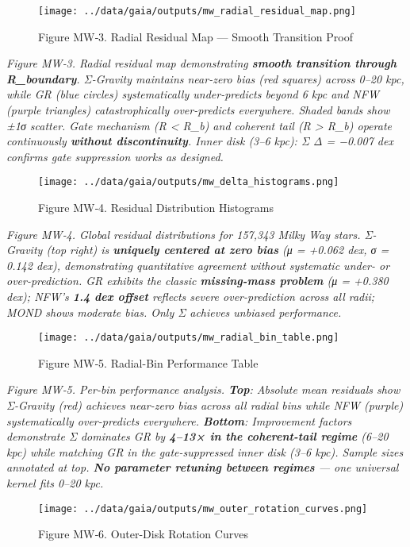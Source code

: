 \documentclass[11pt,a4paper]{article}
\begin{document}
\begin{figure}[h]
\centering
\texttt{[image: ../data/gaia/outputs/mw\_radial\_residual\_map.png]}
\caption{Figure MW‑3. Radial Residual Map — Smooth Transition Proof}
\end{figure}


\textit{Figure MW‑3. Radial residual map demonstrating \textbf{smooth transition through R\_boundary}. Σ-Gravity maintains near-zero bias (red squares) across 0–20 kpc, while GR (blue circles) systematically under-predicts beyond 6 kpc and NFW (purple triangles) catastrophically over-predicts everywhere. Shaded bands show ±1σ scatter. Gate mechanism (R < R\_b) and coherent tail (R > R\_b) operate continuously \textbf{without discontinuity}. Inner disk (3–6 kpc): Σ Δ = −0.007 dex confirms gate suppression works as designed.}


\begin{figure}[h]
\centering
\texttt{[image: ../data/gaia/outputs/mw\_delta\_histograms.png]}
\caption{Figure MW‑4. Residual Distribution Histograms}
\end{figure}


\textit{Figure MW‑4. Global residual distributions for 157,343 Milky Way stars. Σ-Gravity (top right) is \textbf{uniquely centered at zero bias} (μ = +0.062 dex, σ = 0.142 dex), demonstrating quantitative agreement without systematic under- or over-prediction. GR exhibits the classic \textbf{missing-mass problem} (μ = +0.380 dex); NFW's \textbf{1.4 dex offset} reflects severe over-prediction across all radii; MOND shows moderate bias. Only Σ achieves unbiased performance.}


\begin{figure}[h]
\centering
\texttt{[image: ../data/gaia/outputs/mw\_radial\_bin\_table.png]}
\caption{Figure MW‑5. Radial-Bin Performance Table}
\end{figure}


\textit{Figure MW‑5. Per-bin performance analysis. \textbf{Top}: Absolute mean residuals show Σ-Gravity (red) achieves near-zero bias across all radial bins while NFW (purple) systematically over-predicts everywhere. \textbf{Bottom}: Improvement factors demonstrate Σ dominates GR by \textbf{4–13× in the coherent-tail regime} (6–20 kpc) while matching GR in the gate-suppressed inner disk (3–6 kpc). Sample sizes annotated at top. \textbf{No parameter retuning between regimes} — one universal kernel fits 0–20 kpc.}


\begin{figure}[h]
\centering
\texttt{[image: ../data/gaia/outputs/mw\_outer\_rotation\_curves.png]}
\caption{Figure MW‑6. Outer-Disk Rotation Curves}
\end{figure}
\end{document}
